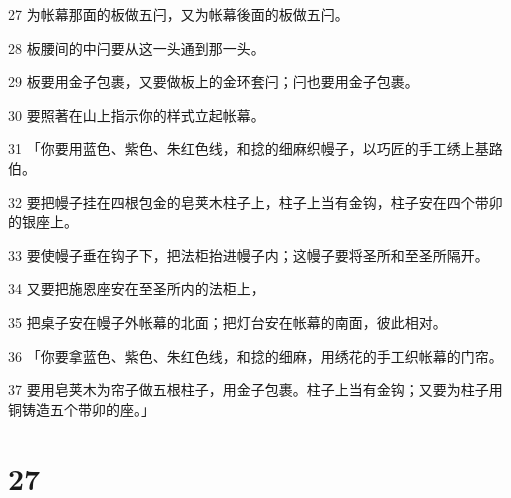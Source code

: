 \par 27 为帐幕那面的板做五闩，又为帐幕後面的板做五闩。
\par 28 板腰间的中闩要从这一头通到那一头。
\par 29 板要用金子包裹，又要做板上的金环套闩；闩也要用金子包裹。
\par 30 要照著在山上指示你的样式立起帐幕。
\par 31 「你要用蓝色、紫色、朱红色线，和捻的细麻织幔子，以巧匠的手工绣上基路伯。
\par 32 要把幔子挂在四根包金的皂荚木柱子上，柱子上当有金钩，柱子安在四个带卯的银座上。
\par 33 要使幔子垂在钩子下，把法柜抬进幔子内；这幔子要将圣所和至圣所隔开。
\par 34 又要把施恩座安在至圣所内的法柜上，
\par 35 把桌子安在幔子外帐幕的北面；把灯台安在帐幕的南面，彼此相对。
\par 36 「你要拿蓝色、紫色、朱红色线，和捻的细麻，用绣花的手工织帐幕的门帘。
\par 37 要用皂荚木为帘子做五根柱子，用金子包裹。柱子上当有金钩；又要为柱子用铜铸造五个带卯的座。」

\chapter{27}

